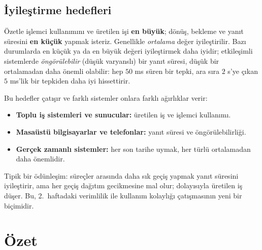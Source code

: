 \documentclass[11pt,a4paper]{article}
\begin{document}
\subsection{İyileştirme hedefleri}

Özetle işlemci kullanımını ve üretilen işi \textbf{en büyük}; dönüş, bekleme ve yanıt süresini \textbf{en küçük} yapmak isteriz. Genellikle \emph{ortalama} değer iyileştirilir. Bazı durumlarda en küçük ya da en büyük değeri iyileştirmek daha iyidir; etkileşimli sistemlerde \emph{öngörülebilir} (düşük varyanslı) bir yanıt süresi, düşük bir ortalamadan daha önemli olabilir: hep $50$ ms süren bir tepki, ara sıra $2$ s'ye çıkan $5$ ms'lik bir tepkiden daha iyi hissettirir.

Bu hedefler çatışır ve farklı sistemler onlara farklı ağırlıklar verir:
\begin{itemize}
  \item \textbf{Toplu iş sistemleri ve sunucular:} üretilen iş ve işlemci kullanımı.
  \item \textbf{Masaüstü bilgisayarlar ve telefonlar:} yanıt süresi ve öngörülebilirliği.
  \item \textbf{Gerçek zamanlı sistemler:} her son tarihe uymak, her türlü ortalamadan daha önemlidir.
\end{itemize}
Tipik bir ödünleşim: süreçler arasında daha sık geçiş yapmak yanıt süresini iyileştirir, ama her geçiş dağıtım gecikmesine mal olur; dolayısıyla üretilen iş düşer. Bu, 2.~haftadaki verimlilik ile kullanım kolaylığı çatışmasının yeni bir biçimidir.

\section{Özet}
\end{document}
